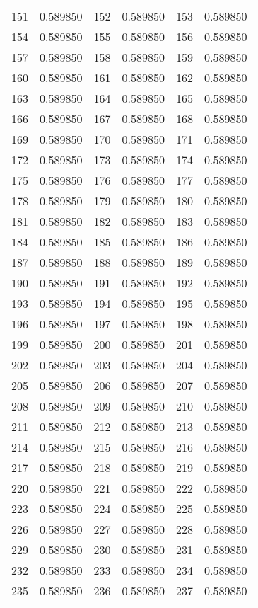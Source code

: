 \documentclass[12pt]{article}
\begin{document}
\begin{longtable}{@{}cc|cc|cc@{}}
151 & 0.589850 & 152 & 0.589850 & 153 & 0.589850 \\
154 & 0.589850 & 155 & 0.589850 & 156 & 0.589850 \\
157 & 0.589850 & 158 & 0.589850 & 159 & 0.589850 \\
160 & 0.589850 & 161 & 0.589850 & 162 & 0.589850 \\
163 & 0.589850 & 164 & 0.589850 & 165 & 0.589850 \\
166 & 0.589850 & 167 & 0.589850 & 168 & 0.589850 \\
169 & 0.589850 & 170 & 0.589850 & 171 & 0.589850 \\
172 & 0.589850 & 173 & 0.589850 & 174 & 0.589850 \\
175 & 0.589850 & 176 & 0.589850 & 177 & 0.589850 \\
178 & 0.589850 & 179 & 0.589850 & 180 & 0.589850 \\
181 & 0.589850 & 182 & 0.589850 & 183 & 0.589850 \\
184 & 0.589850 & 185 & 0.589850 & 186 & 0.589850 \\
187 & 0.589850 & 188 & 0.589850 & 189 & 0.589850 \\
190 & 0.589850 & 191 & 0.589850 & 192 & 0.589850 \\
193 & 0.589850 & 194 & 0.589850 & 195 & 0.589850 \\
196 & 0.589850 & 197 & 0.589850 & 198 & 0.589850 \\
199 & 0.589850 & 200 & 0.589850 & 201 & 0.589850 \\
202 & 0.589850 & 203 & 0.589850 & 204 & 0.589850 \\
205 & 0.589850 & 206 & 0.589850 & 207 & 0.589850 \\
208 & 0.589850 & 209 & 0.589850 & 210 & 0.589850 \\
211 & 0.589850 & 212 & 0.589850 & 213 & 0.589850 \\
214 & 0.589850 & 215 & 0.589850 & 216 & 0.589850 \\
217 & 0.589850 & 218 & 0.589850 & 219 & 0.589850 \\
220 & 0.589850 & 221 & 0.589850 & 222 & 0.589850 \\
223 & 0.589850 & 224 & 0.589850 & 225 & 0.589850 \\
226 & 0.589850 & 227 & 0.589850 & 228 & 0.589850 \\
229 & 0.589850 & 230 & 0.589850 & 231 & 0.589850 \\
232 & 0.589850 & 233 & 0.589850 & 234 & 0.589850 \\
235 & 0.589850 & 236 & 0.589850 & 237 & 0.589850 \\

\end{longtable}
\end{document}

